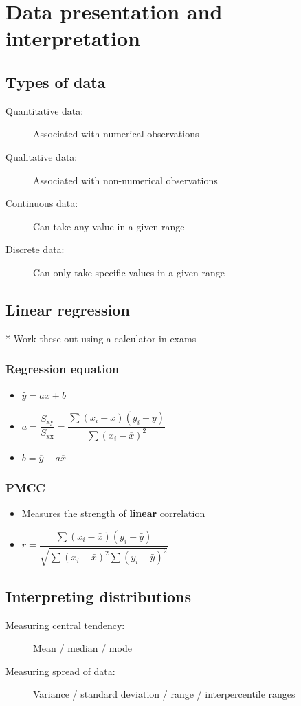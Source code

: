 \documentclass[A4paper, 11pt]{article}
\begin{document}
	\section{Data presentation and interpretation}
	\subsection{Types of data}
	\begin{description}
		\item[Quantitative data:] Associated with numerical observations
		\item[Qualitative data:] Associated with non-numerical observations
		\item[Continuous data:] Can take any value in a given range
		\item[Discrete data:] Can only take specific values in a given range
	\end{description}
	
	\subsection{Linear regression}
	* Work these out using a calculator in exams
	\subsubsection{Regression equation}
	\begin{itemize}
		\item $\hat{y}=ax+b$
		\item $a=\dfrac{S_{\mathrm{xy}}}{S_{\mathrm{xx}}}=\dfrac{\sum (x_i-\overline{x}) (y_i-\overline{y})}{\sum (x_i-\overline{x})^2}$
		\item $b=\overline{y}-a\overline{x}$
	\end{itemize}
	
	\subsubsection{PMCC}
	\begin{itemize}
		\item Measures the strength of \textbf{linear} correlation
		\item  $r =\dfrac{\sum\left(x_{i}-\bar{x}\right)\left(y_{i}-\bar{y}\right)}{\sqrt{\sum\left(x_{i}-\bar{x}\right)^{2} \sum\left(y_{i}-\bar{y}\right)^{2}}}$
	\end{itemize}
	
	\subsection{Interpreting distributions}
	\begin{description}
		\item[Measuring central tendency:] Mean / median / mode
		\item[Measuring spread of data:] Variance / standard deviation / range / interpercentile ranges
	
	\end{description}
	
\end{document}
